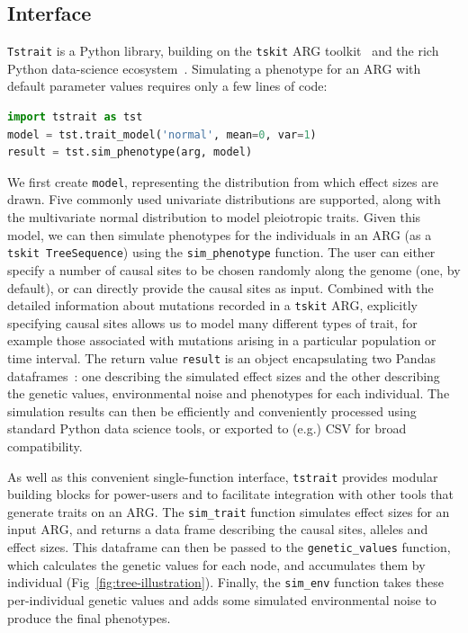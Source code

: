 \documentclass[unnumsec,webpdf,modern,large,namedate]{oup-authoring-template}%
\begin{document}
\subsection{Interface}
\texttt{Tstrait} is a Python library, building on the \texttt{tskit}
ARG toolkit~\citep{ralph2020,wong2023general} and the rich
Python data-science ecosystem~\citep{numpy}.
Simulating a phenotype for an ARG with default parameter
values requires only a few lines of code:
\begin{lstlisting}[language=Python,aboveskip=1em,belowskip=1em]
import tstrait as tst
model = tst.trait_model('normal', mean=0, var=1)
result = tst.sim_phenotype(arg, model)
\end{lstlisting}
We first create \texttt{model}, representing the distribution
from which effect sizes are drawn. Five commonly used
univariate distributions are supported, along with the
multivariate normal distribution to model pleiotropic traits.
Given this model, we can then simulate phenotypes for the individuals
in an ARG (as a  \texttt{tskit TreeSequence}) using the
\texttt{sim\_phenotype} function.
The user can either specify a number of causal sites to be chosen randomly
along the genome (one, by default), or can directly provide the causal
sites as input. Combined with the detailed information about
mutations recorded in a \texttt{tskit} ARG, explicitly specifying causal
sites allows us to model many different types of trait, for example
those associated with mutations arising in a particular population
or time interval.
The return value \texttt{result} is an object encapsulating
two Pandas dataframes~\citep{mckinney2010data}: one describing the simulated
effect sizes and the other describing the genetic values,
environmental noise and phenotypes for each individual.
The simulation results can then be efficiently and conveniently
processed using standard Python data science tools, or exported
to (e.g.) CSV for broad compatibility.

As well as this convenient single-function interface,
\texttt{tstrait} provides modular building blocks for power-users
and to facilitate integration with other tools that generate
traits on an ARG. The \texttt{sim\_trait} function
simulates effect sizes for an input ARG, and returns a data frame
describing the causal sites, alleles and effect sizes.
This dataframe can then be passed to the \texttt{genetic\_values}
function, which calculates the genetic values for each
node, and accumulates them by individual
(Fig~\ref{fig:tree-illustration}). Finally, the \texttt{sim\_env}
function takes these per-individual genetic values
and adds some simulated environmental noise to produce the final
phenotypes.
\end{document}
